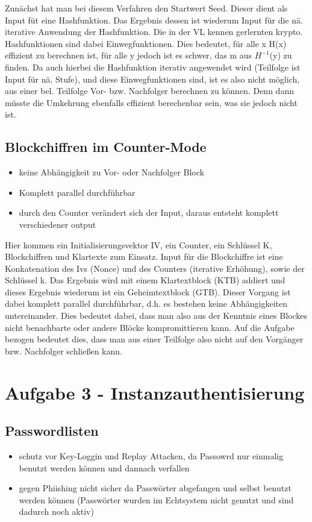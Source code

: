 \documentclass{scrartcl}
\begin{document}
Zunächst hat man bei diesem Verfahren den Startwert Seed. Dieser dient als Input füt eine Hashfunktion. Das Ergebnis
dessen ist wiederum Input für die nä. iterative Anwendung der Hashfunktion. Die in der VL kennen gerlernten krypto.
Hashfunktionen sind dabei Einwegfunktionen. Dies bedeutet, für alle x H(x) effizient zu berechnen ist, für alle y
jedoch ist es schwer, das m aus $H^{-1}$(y) zu finden. Da auch hierbei die Hashfunktion iterativ angewendet wird
(Teilfolge ist Input für nä. Stufe), und diese Einwegfunktionen sind, ist es also nicht möglich, aus einer bel.
Teilfolge Vor- bzw. Nachfolger berechnen zu können. Denn dann müsste die Umkehrung ebenfalls effizient berechenbar
sein, was sie jedoch nicht ist.

\subsection*{Blockchiffren im Counter-Mode}
\begin{itemize}
  \item keine Abhängigkeit zu Vor- oder Nachfolger Block
  \item Komplett parallel durchführbar
  \item durch den Counter verändert sich der Input, daraus entsteht komplett
    verschiedener output
\end{itemize}

Hier kommen ein Initialisierungsvektor IV, ein Counter, ein Schlüssel K, Blockchiffren und Klartexte zum Einsatz.
Input für die Blockchiffre ist eine Konkatenation des Ivs (Nonce) und des Counters (iterative Erhöhung), sowie der
Schlüssel k. Das Ergebnis wird mit einem Klartextblock (KTB) addiert und dieses Ergebnis wiederum ist ein 
Geheimtextblock (GTB). Dieser Vorgang ist dabei komplett parallel durchführbar, d.h. es bestehen keine 
Abhängigkeiten untereinander. Dies bedeutet dabei, dass man also aus der Kenntnis eines Blockes nicht 
benachbarte oder andere Blöcke kompromittieren kann. Auf die Aufgabe bezogen bedeutet dies, dass man 
aus einer Teilfolge also nicht auf den Vorgänger bzw. Nachfolger schließen kann.

\section*{Aufgabe 3 - Instanzauthentisierung}
\subsection*{Passwordlisten}
\begin{itemize}
  \item schutz vor Key-Loggin und Replay Attacken, da Passowrd nur einmalig
    benutzt werden können und dannach verfallen
  \item gegen Phiishing nicht sicher da Passwörter abgefangen und selbst
    benutzt werden können (Passwörter wurden im Echtsystem nicht genutzt und
    sind dadurch noch aktiv)
\end{itemize}
\end{document}
